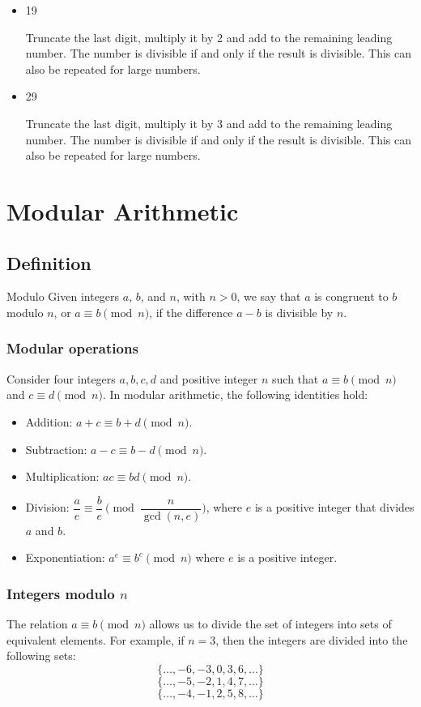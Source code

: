 \begin{itemize}
\item 19

Truncate the last digit, multiply it by 2 and add to the remaining leading number. The number is divisible if and only if the result is divisible. This can also be repeated for large numbers.

\item 29

Truncate the last digit, multiply it by 3 and add to the remaining leading number. The number is divisible if and only if the result is divisible. This can also be repeated for large numbers.
\end{itemize}

\chapter{Modular Arithmetic}

\section{Definition}
\begin{defn}{Modulo}{}
Given integers $a$, $b$, and $n$, with $n > 0$, we say that $a$ is congruent to $b$ modulo $n$, or $a \equiv b \pmod n$, if the difference $a-b$ is divisible by $n$.
\end{defn}

\subsection{Modular operations}
Consider four integers $a,b,c,d$ and positive integer $n$ such that $a \equiv b \pmod n$ and $c \equiv d \pmod n$. In modular arithmetic, the following identities hold:
\begin{itemize}
\item Addition: $a+c\equiv b+d\pmod n$.
\item Subtraction: $a-c\equiv b-d\pmod n$.
\item Multiplication: $ac\equiv bd\pmod n$.
\item Division: $\dfrac{a}{e}\equiv \dfrac{b}{e}\pmod {\dfrac{n}{\gcd(n,e)}}$, where $e$ is a positive integer that divides ${a}$ and $b$.
\item Exponentiation: $a^e\equiv b^e\pmod n$ where $e$ is a positive integer.
\end{itemize}

\subsection{Integers modulo $n$}
The relation $a \equiv b \pmod{n}$ allows us to divide the set of integers into sets of equivalent elements. For example, if $n = 3$, then the integers are divided into the following sets:
\[ \{ \dots, -6, -3, 0, 3, 6, \dots \} \]
\[ \{ \dots, -5, -2, 1, 4, 7, \dots \} \]
\[ \{ \dots, -4, -1, 2, 5, 8, \dots \} \]

